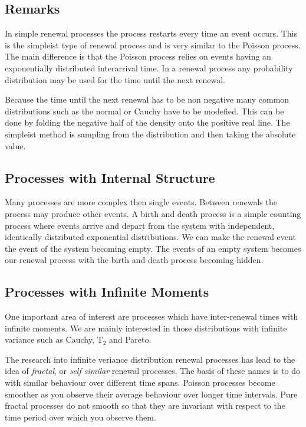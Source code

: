 \subsection{Remarks}

In simple renewal processes the process restarts every time an event
occurs.  This is the simpleist type of renewal process and is very
similar to the Poisson process.  The main difference is that the
Poisson process relies on events having an exponentially distributed
interarrival time.  In a renewal process any probability distribution
may be used for the time until the next renewal.

Because the time until the next renewal has to be non negative
many common distributions such as the normal or Cauchy have to be
modefied.  This can be done by folding the negative half of the
density onto the positive real line.  The simpleist method is sampling
from the distribution and then taking the absolute value.

\subsection{Processes with Internal Structure}

Many processes are more complex then single events.  Between renewals
the process may produce other events.  A birth and death process is a
simple counting process where events arrive and depart from the system
with independent, identically distributed exponential distributions.
We can make the renewal event the event of the system becoming empty.
The events of an empty system becomes our renewal process with the
birth and death process becoming hidden.

\subsection{Processes with Infinite Moments}

One important area of interest are processes which have inter-renewal
times with infinite moments.  We are mainly interested in those
distributions with infinite variance such as Cauchy, $\mbox{T}_2$ and
Pareto.

The research into infinite veriance distribution renewal processes has
lead to the idea of {\em fractal}, or {\em self similar} renewal
processes.  The basis of these names is to do with similar behaviour
over different time spans.  Poisson processes become smoother as you
observe their average behaviour over longer time intervals.  Pure
fractal processes do not smooth so that they are invariant with
respect to the time period over which you observe them.


